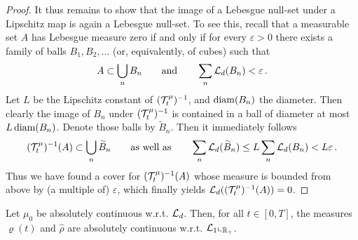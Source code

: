 \begin{proof}
	It thus remains to show that the image of a Lebesgue null-set under a Lipschitz map is again a Lebesgue null-set. To see this,
	recall that a measurable set $A$ has Lebesgue measure zero if and only if for every $\varepsilon>0$ there exists a
	family of balls $B_1,B_2,\ldots$ (or, equivalently, of cubes) such that
	\begin{align*}
		A\subset\bigcup_n B_n\qquad\text{and}\qquad\sum_n\mathcal{L}_d(B_n)<\varepsilon\,.
	\end{align*}
	Let $L$ be the Lipschitz constant of $(\mathcal{T}^\mu_t)^{-1}$, and $\operatorname{diam}(B_n)$ the diameter. Then clearly the image of
	$B_n$ under $(\mathcal{T}^\mu_t)^{-1}$ is contained in a ball of diameter at most $L\operatorname{diam}(B_n)$. Denote those balls by
	$\widetilde B_n$.
	Then it immediately follows
	\begin{align*}
		(\mathcal{T}^\mu_t)^{-1}(A)\subset\bigcup_n\widetilde B_n\qquad\text{as well as}\qquad
		\sum_n\mathcal{L}_d(\widetilde B_n)\leq L\sum_n\mathcal{L}_d(B_n)<L\varepsilon\,.
	\end{align*}
	Thus we have found a cover for $(\mathcal{T}^\mu_t)^{-1}(A)$ whose measure is bounded from above by (a multiple of) $\varepsilon$, which finally
	yields $\mathcal{L}_d((\mathcal{T}^\mu_t)^{-1}(A))=0$.
\end{proof}

\begin{lemma}\label{le-abs}
	Let $\mu_0$ be absolutely continuous w.r.t. $\mathcal{L}_d$. Then, for all $t\in [0,T]$, the measures $\varrho(t)$ and $\widehat  \rho$ are absolutely
	continuous w.r.t. $\mathcal{L}_1\llcorner_{\mathbb{R}_+}$.
\end{lemma}

